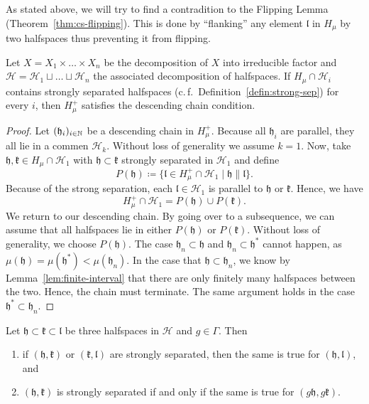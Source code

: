 As stated above, we will try to find a contradition to the Flipping Lemma (Theorem~\ref{thm:cs-flipping}). This is done by \enquote{flanking} any element \(\mathfrak{l}\) in \(H_\mu\) by two halfspaces thus preventing it from flipping.

\begin{lemma}[{\cite[Lemma~4.18]{MR3509968}}]
  \label{lem:4.18}
  Let \(X = X_1 \times \dots \times X_n\) be the decomposition of \(X\) into irreducible factor and \(\mathcal{H} = \mathcal{H}_1 \sqcup \dots \sqcup \mathcal{H}_n\) the associated decomposition of halfspaces. If \(H_\mu \cap \mathcal{H}_i\) contains strongly separated halfspaces (c.\,f.~Definition~\ref{defin:strong-sep}) for every \(i\), then \(H_\mu^+\) satisfies the descending chain condition.
\end{lemma}

\begin{proof}
  Let \((\mathfrak{h}_i)_{i \in \mathbb{N}}\) be a descending chain in \(H_\mu^+\). Because all \(\mathfrak{h}_i\) are parallel, they all lie in a commen \(\mathcal{H}_k\). Without loss of generality we assume \(k=1\). Now, take \(\mathfrak{h, k} \in H_\mu \cap \mathcal{H}_1\) with \(\mathfrak{h} \subset \mathfrak{k}\) strongly separated in \(\mathcal{H}_1\) and define
  \[
    P(\mathfrak{h}) \coloneqq \{\mathfrak{l} \in H_\mu^+ \cap \mathcal{H}_1 \mid \mathfrak{h} \parallel \mathfrak{l}\}.
  \]
  Because of the strong separation, each \(\mathfrak{l} \in \mathcal{H}_1\) is parallel to \(\mathfrak{h}\) or \(\mathfrak{k}\). Hence, we have
  \[
    H_\mu^+ \cap \mathcal{H}_1 = P(\mathfrak{h}) \cup P(\mathfrak{k}).
  \]
  We return to our descending chain. By going over to a subsequence, we can assume that all halfspaces lie in either \(P(\mathfrak{h})\) or \(P(\mathfrak{k})\). Without loss of generality, we choose \(P(\mathfrak{h})\). The case \(\mathfrak{h}_n \subset \mathfrak{h}\) and \(\mathfrak{h}_n \subset \mathfrak{h}^\ast\) cannot happen, as \(\mu(\mathfrak{h}) = \mu(\mathfrak{h}^\ast) < \mu(\mathfrak{h}_n)\). In the case that \(\mathfrak{h} \subset \mathfrak{h}_n\), we know by Lemma~\ref{lem:finite-interval} that there are only finitely many halfspaces between the two. Hence, the chain must terminate. The same argument holds in the case \(\mathfrak{h}^\ast \subset \mathfrak{h}_n\).
\end{proof}


\begin{lemma}
  \label{lem:strongly-sep}
  Let \(\mathfrak{h} \subset \mathfrak{k} \subset \mathfrak{l}\) be three halfspaces in \(\mathcal{H}\) and \(g \in \Gamma\). Then
  \begin{enumerate}
  \item if \((\mathfrak{h}, \mathfrak{k})\) or \((\mathfrak{k}, \mathfrak{l})\) are strongly separated, then the same is true for \((\mathfrak{h}, \mathfrak{l})\), and
  \item \((\mathfrak{h}, \mathfrak{k})\) is strongly separated if and only if the same is true for \((g\mathfrak{h}, g\mathfrak{k})\).
  \end{enumerate}
\end{lemma}

